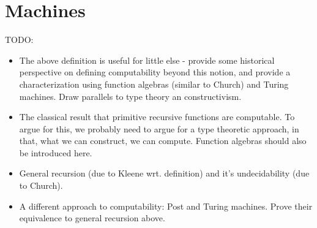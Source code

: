 \section{Machines}

\pagebreak

TODO:

\begin{itemize}

\item The above definition is useful for little else - provide some historical
perspective on defining computability beyond this notion, and provide a
characterization using function algebras (similar to Church) and Turing
machines. Draw parallels to type theory an constructivism.

\item The classical result that primitive recursive functions are computable.
To argue for this, we probably need to argue for a type theoretic approach, in
that, what we can construct, we can compute. Function algebras should also be
introduced here.

\item General recursion (due to Kleene wrt. definition) and it's undecidability
(due to Church).

\item A different approach to computability: Post and Turing machines. Prove
their equivalence to general recursion above.

\end{itemize}




